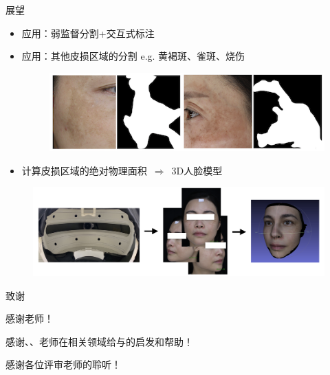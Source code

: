 \begin{frame}{展望}
\begin{itemize}
\item 应用：弱监督分割+交互式标注
\item 应用：其他皮损区域的分割 e.g. 黄褐斑、雀斑、烧伤
\begin{figure}
    \includegraphics[width=.6\linewidth]{figures/meldemo.png}
\end{figure}

\item 计算皮损区域的绝对物理面积~$\Rightarrow$~3D人脸模型
\end{itemize}

\begin{figure}
    \includegraphics[width=.9\linewidth]{figures/statCamera.png}
\end{figure}

\end{frame}


\begin{frame}{}
\centering \huge
致谢

\vspace{.8cm}

\Large
感谢{\color{blue}{夏思宇}}老师！

\vspace{.4cm}

感谢{\color{blue}{钱堃}}、{\color{blue}{王雁刚}}、{\color{blue}{王辰星}}老师在相关领域给与的启发和帮助！

\vspace{.4cm}

感谢各位评审老师的聆听！
\end{frame}

















